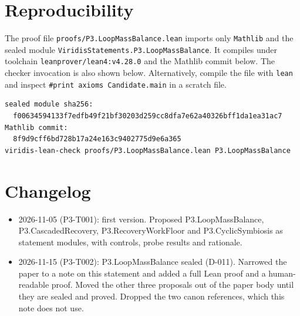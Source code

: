 \documentclass[11pt]{article}
\theoremstyle{definition}
\theoremstyle{remark}
\begin{document}
\section{Reproducibility}
\sloppy
The proof file \texttt{proofs/P3.LoopMassBalance.lean} imports only \texttt{Mathlib} and the
sealed module \texttt{ViridisStatements.P3.LoopMassBalance}. It compiles under toolchain
\texttt{leanprover/lean4:v4.28.0} and the Mathlib commit below. The checker invocation is also
shown below. Alternatively, compile the file with \texttt{lean} and inspect
\texttt{\#print axioms Candidate.main} in a scratch file.
\begin{lstlisting}[language={},frame=none]
sealed module sha256:
  f00634594133f7edfb49f21bf30203d259cc8dfa7e62a40326bff1da1ea31ac7
Mathlib commit:
  8f9d9cff6bd728b17a24e163c9402775d9e6a365
viridis-lean-check proofs/P3.LoopMassBalance.lean P3.LoopMassBalance
\end{lstlisting}

\section{Changelog}
\begin{itemize}
\item 2026-11-05 (P3-T001): first version. Proposed P3.LoopMassBalance, P3.CascadedRecovery,
P3.RecoveryWorkFloor and P3.CyclicSymbiosis as statement modules, with controls, probe results
and rationale.
\item 2026-11-15 (P3-T002): P3.LoopMassBalance sealed (D-011). Narrowed the paper to a note on
this statement and added a full Lean proof and a human-readable proof. Moved the other three
proposals out of the paper body until they are sealed and proved. Dropped the two canon
references, which this note does not use.
\end{itemize}



\end{document}
